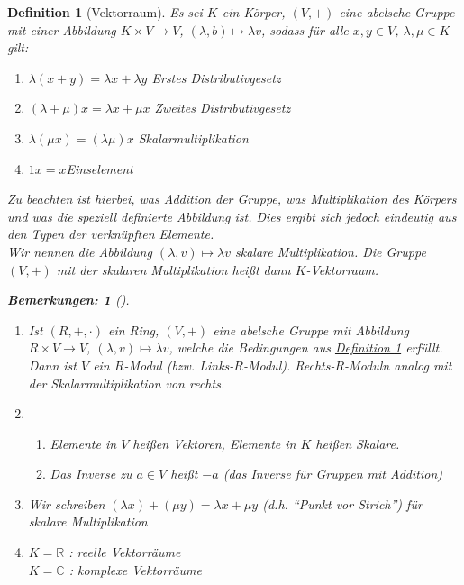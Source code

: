 \documentclass{report}
\newcommand{\IN}[1]{\index{#1|BH}}
\newcommand{\lb}{\lambda}
\newcommand{\R}{\mathbb{R}}
\newcommand{\C}{\mathbb{C}}
\theoremstyle{customrem}
\newtheorem*{bemerkung2}{Bemerkungen\textnormal:}
\newenvironment{bemerkungen}[1][]{\begin{bemerkung2}[#1]\leavevmode}{\end{bemerkung2}}
\theoremstyle{customdef}
\newtheorem{definition}{Definition}[chapter]
\begin{document}
	\begin{definition}[Vektorraum]
		\IN{Vektorraum}
		\label{def21}
		Es sei \(K\) ein Körper, \((V, +)\) eine abelsche Gruppe mit einer Abbildung \(K \times V \to V\), \((\lb, b) \mapsto \lb v\), sodass für alle \(x, y \in V\), \(\lb, \mu \in K\) gilt:
		
		\begin{enumerate}[leftmargin=3cm, rightmargin=2cm]
			\itemsep0cm
			\item \(\lb (x + y) = \lb x + \lb y\) \hfill Erstes Distributivgesetz
			\item \((\lb + \mu) x = \lb x + \mu x\) \hfill Zweites Distributivgesetz
			\item \(\lb (\mu x) = (\lb \mu) x\)	\hfill Skalarmultiplikation
			\item \(1 x = x\)\hfill Einselement
		\end{enumerate}
		
		
		Zu beachten ist hierbei, was Addition der Gruppe, was Multiplikation des Körpers und was die speziell definierte Abbildung ist. Dies ergibt sich jedoch eindeutig aus den Typen der verknüpften Elemente.\\
		Wir nennen die Abbildung \((\lb, v) \mapsto \lb v\) skalare Multiplikation. Die Gruppe \((V, +)\) mit der skalaren Multiplikation  heißt dann \(K\)-Vektorraum.
		
		\begin{bemerkungen}
			\begin{enumerate}
				\item Ist \((R, +, \cdot)\) ein Ring, \((V, +)\) eine abelsche Gruppe mit Abbildung \(R \times V \to V\), \((\lb, v) \mapsto \lb v\), welche die Bedingungen aus \hyperref[def21]{Definition \ref*{def21}} erfüllt. Dann ist \(V\) ein \(R\)-Modul (bzw. Links-\(R\)-Modul).	Rechts-\(R\)-Moduln analog mit der Skalarmultiplikation von rechts.
				\item
				\begin{enumerate}
					\item Elemente in \(V\) heißen Vektoren, Elemente in \(K\) heißen Skalare.
					\item Das Inverse zu \(a \in V\) heißt \(-a\) (das Inverse für Gruppen mit Addition)
				\end{enumerate}
				\item Wir schreiben \((\lb x) + (\mu y) = \lb x + \mu y\) (d.h. "`Punkt vor Strich"') für skalare Multiplikation
				\item
				\(K = \R\) : reelle Vektorräume\\
				\(K = \C\) : komplexe Vektorräume
			\end{enumerate}
		\end{bemerkungen}
		

\end{definition}
\end{document}
